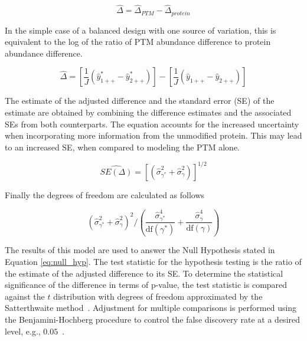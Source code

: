 \documentclass[mcp]{article}
\numberwithin{table}{section}
\begin{document}
\begin{equation}
\hat{\Delta} = \hat{\Delta}_{PTM} - \hat{\Delta}_{protein} 
\end{equation}

In the simple case of a balanced design with one source of variation, this is equivalent to the log of the ratio of PTM abundance difference to protein abundance difference.

\begin{equation}
\hat{\Delta} = \left[ \frac{1}{J} \left( \hat{y}_{1++}^{\ast} - \hat{y}_{2++}^{\ast} \right) \right] - \left[ \frac{1}{J} \left( \hat{y}_{1++} - \hat{y}_{2++} \right) \right]
\label{eq:prop_fc}
\end{equation}

The estimate of the adjusted difference and the standard error (SE) of the estimate are obtained by combining the difference estimates and the associated SEs from both counterparts. The equation accounts for the increased uncertainty when incorporating more information from the unmodified protein. This may lead to an increased SE, when compared to modeling the PTM alone.

\begin{equation}
\widehat{SE(\Delta)} = \left[ \left( \hat{\sigma}_{\gamma^{\ast}}^{2} + \hat{\sigma}_{\gamma}^{2} \right) \right]^{1/2}
\label{eq:prop_se}
\end{equation}

Finally the degrees of freedom are calculated as follows

\begin{equation}
\left( \hat{\sigma}_{\gamma^{\ast}}^{2} + \hat{\sigma}_{\gamma}^{2} \right)^2 \bigg/
\left( \frac{\hat{\sigma}_{\gamma^{\ast}}^{4}}{\mathrm{df}(\gamma^{\ast})} + \frac{\hat{\sigma}_{\gamma}^{4}}{ \mathrm{df}(\gamma)} \right)
\label{eq:prop_df}
\end{equation}

The results of this model are used to answer the Null Hypothesis stated in Equation \ref{eq:null_hyp}. The test statistic for the hypothesis testing is the ratio of the estimate of the adjusted difference to its SE. To determine the statistical significance of the difference in terms of p-value, the test statistic is compared against the $t$ distribution with degrees of freedom approximated by the Satterthwaite method~\cite{satterthwaite:1946}. Adjustment for multiple comparisons is performed using the Benjamini-Hochberg procedure to control the false discovery rate at a desired level, e.g., $0.05$~\cite{Benjamini:1995}.
\end{document}

